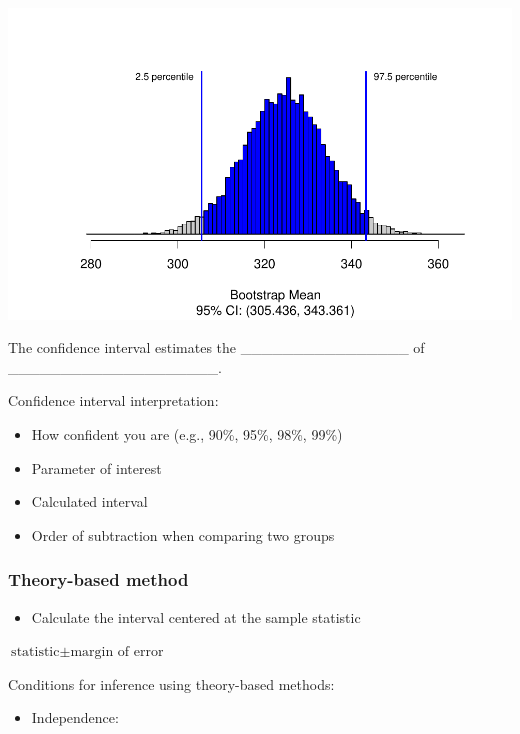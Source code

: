 \documentclass[
]{report}
\providecommand{\tightlist}{%
  \setlength{\itemsep}{0pt}\setlength{\parskip}{0pt}}
\newcommand{\rgi}{\hspace{24pt}}  %
\begin{document}
\begin{center}\includegraphics[width=0.7\linewidth]{07-VN07-one_meantheory_files/figure-latex/unnamed-chunk-4-1} \end{center}

The confidence interval estimates the \_\_\_\_\_\_\_\_\_\_\_\_\_\_\_\_
of \_\_\_\_\_\_\_\_\_\_\_\_\_\_\_\_\_\_\_\_.

Confidence interval interpretation:

\begin{itemize}
\item
  How confident you are (e.g., 90\%, 95\%, 98\%, 99\%)
\item
  Parameter of interest
\item
  Calculated interval
\item
  Order of subtraction when comparing two groups
\end{itemize}

\vspace{0.8in}

\newpage

\subsubsection*{Theory-based method}\label{theory-based-method-2}

\begin{itemize}
\tightlist
\item
  Calculate the interval centered at the sample statistic
\end{itemize}

\rgi \(\text{statistic} \pm \text{margin of error}\)

\vspace{0.5in}

Conditions for inference using theory-based methods:

\begin{itemize}
\tightlist
\item
  Independence:
\end{itemize}
\end{document}
